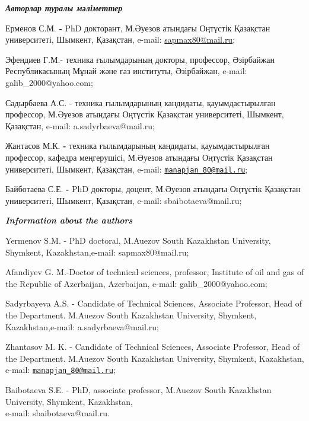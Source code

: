 \begin{authorinfo}
 \hspace{1em}\emph{{\bfseries Авторлар туралы мәліметтер}}

Ерменов С.М. {\bfseries -} PhD докторант, М.Әуезов атындағы Оңтүстік
Қазақстан университеті, Шымкент, Қазақстан, e-mail:
\href{mailto:\%20sapmax80@mail.ru}{sapmax80@mail.ru};

Эфендиев Г.М.- техника ғылымдарының докторы, профессор, Әзірбайжан
Республикасының Мұнай және газ институты, Әзірбайжан, e-mail:
galib\_2000@yahoo.com;

Садырбаева А.С. - техника ғылымдарының кандидаты, қауымдастырылған
профессор, М.Әуезов атындағы Оңтүстік Қазақстан университеті, Шымкент,
Қазақстан, e-mail: a.sadyrbaeva@mail.ru;

Жантасов М.К. {\bfseries -} техника ғылымдарының кандидаты,
қауымдастырылған профессор, кафедра меңгерушісі, М.Әуезов атындағы
Оңтүстік Қазақстан университеті, Шымкент, Қазақстан, e-mail:
\href{mailto:manapjan_80@mail.ru}{\nolinkurl{manapjan\_80@mail.ru}};

Байботаева С.Е. {\bfseries -} PhD докторы, доцент, М.Әуезов атындағы
Оңтүстік Қазақстан университеті, Шымкент, Қазақстан, e-mail:
sbaibotaeva@mail.ru;

\hspace{1em}\emph{{\bfseries Information about the authors}}

Yermenov S.M. - PhD doctoral, M.Auezov South Kazakhstan University,
Shymkent, Kazakhstan,e-mail: sapmax80@mail.ru;

Afandiyev G. M.-Doctor of technical sciences, professor, Institute of
oil and gas of the Republic of Azerbaijan, Azerbaijan, e-mail:
galib\_2000@yahoo.com;

Sadyrbayeva A.S. - Candidate of Technical Sciences, Associate Professor,
Head of the Department. M.Auezov South Kazakhstan University, Shymkent,
Kazakhstan,e-mail: a.sadyrbaeva@mail.ru;

Zhantasov M. K. - Candidate of Technical Sciences, Associate Professor,
Head of the Department. M.Auezov South Kazakhstan University, Shymkent,
Kazakhstan, e-mail:
\href{mailto:manapjan_80@mail.ru}{\nolinkurl{manapjan\_80@mail.ru}};

Baibotaeva S.E. - PhD, associate professor, M.Auezov South Kazakhstan
University, Shymkent, Kazakhstan,\\e-mail: sbaibotaeva@mail.ru.
\end{authorinfo}
